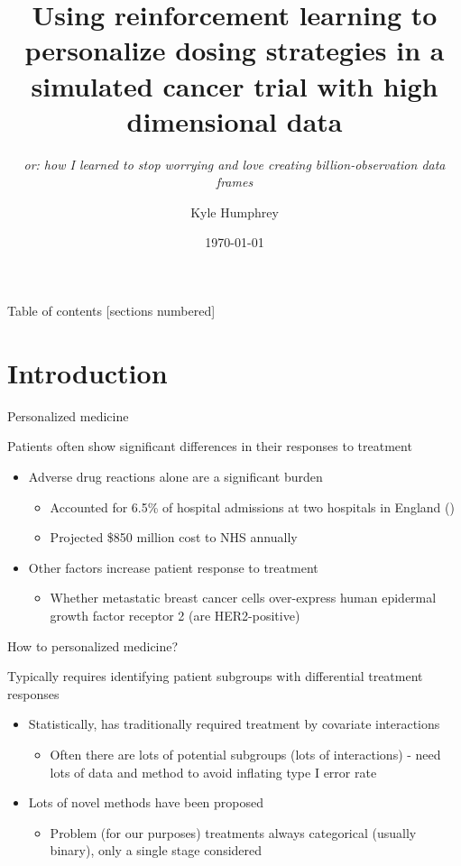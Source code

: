 \documentclass{beamer}
\title{Using reinforcement learning to personalize dosing strategies in a simulated cancer trial with high dimensional data}
\subtitle{\sl or: how I learned to stop worrying and love creating billion-observation data frames}
\date{\today}
\author{Kyle Humphrey}
\institute{University of Arizona}
\begin{document}
\maketitle

\begin{frame}[c]{Table of contents}
  [sections numbered]
  \tableofcontents
\end{frame}

\section{Introduction}

\begin{frame}[c]{Personalized medicine}

Patients often show significant differences in their responses to treatment
\begin{itemize}[<+(1)->]
  \item Adverse drug reactions alone are a significant burden 
  \begin{itemize}
    \item Accounted for 6.5\% of hospital admissions at two hospitals in England  (\cite{Pirmohamed2004})
    \item Projected \$850 million cost to NHS annually 
  \end{itemize}
  \item Other factors increase patient response to treatment
  \begin{itemize}
    \item Whether metastatic breast cancer cells over-express human epidermal growth factor receptor 2 (are HER2-positive)\footnotemark 
  \end{itemize}
\end{itemize}


\end{frame}

\begin{frame}[c]{How to personalized medicine?}

Typically requires identifying patient subgroups with differential treatment responses
\begin{itemize}[<+(1)->]
  \item Statistically, has traditionally required treatment by covariate interactions
  \begin{itemize}
    \item Often there are lots of potential subgroups (lots of interactions) - need lots of data and method to avoid inflating type I error rate
  \end{itemize}
  \item Lots of novel methods have been proposed
  \begin{itemize}
    \item Problem (for our purposes) treatments always categorical (usually binary), only a single stage considered
  \end{itemize}
\end{itemize}

\end{frame}
\end{document}
